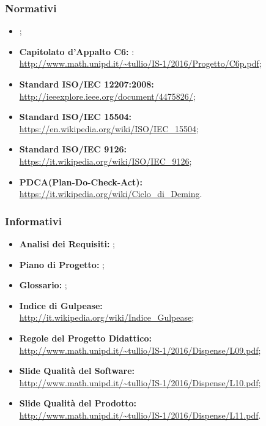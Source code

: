 		\subsubsection{Normativi}
		\begin{itemize}
			\item \emph{\NdP};
			\item \textbf{Capitolato d'Appalto C6: \proj}:
			\\ \url{http://www.math.unipd.it/~tullio/IS-1/2016/Progetto/C6p.pdf};
			\item \textbf{Standard ISO/IEC 12207:2008:}
			\\ \url{http://ieeexplore.ieee.org/document/4475826/};
			\item \textbf{Standard ISO/IEC 15504:}
			\\ \url{https://en.wikipedia.org/wiki/ISO/IEC_15504};
			\item \textbf{Standard ISO/IEC 9126:}
			\\ \url{https://it.wikipedia.org/wiki/ISO/IEC_9126};
			\item \textbf{PDCA(Plan-Do-Check-Act):}
			\\ \url{https://it.wikipedia.org/wiki/Ciclo_di_Deming}.
		\end{itemize}
		
		\subsubsection{Informativi}
		\begin{itemize}
			\item \textbf{Analisi dei Requisiti: }\emph{\AdR};
			\item \textbf{Piano di Progetto: }\emph{\PdP};
			\item \textbf{Glossario: }\emph{\Glossario};
			\item \textbf{Indice di Gulpease:}
			\\ \url{http://it.wikipedia.org/wiki/Indice_Gulpease};
			\item \textbf{Regole del Progetto Didattico:}
			\\ \url{http://www.math.unipd.it/~tullio/IS-1/2016/Dispense/L09.pdf};
			\item \textbf{Slide Qualità del Software:}
			\\ \url{http://www.math.unipd.it/~tullio/IS-1/2016/Dispense/L10.pdf};
			\item \textbf{Slide Qualità del Prodotto:}
			\\ \url{http://www.math.unipd.it/~tullio/IS-1/2016/Dispense/L11.pdf}.
		\end{itemize}
\newpage
